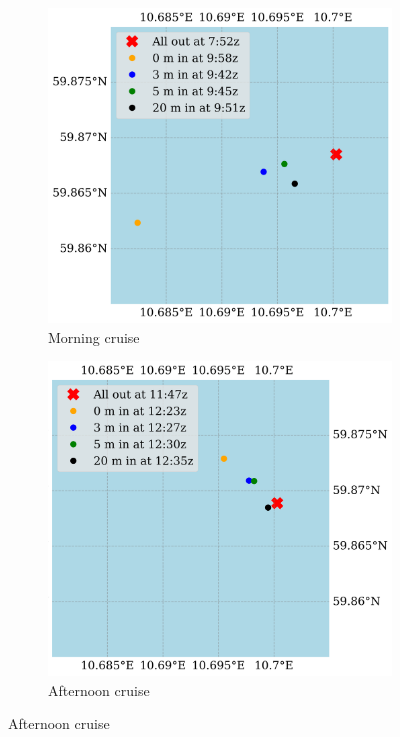 \documentclass[a4paper,10pt,english]{article}
\begin{document}
\begin{figure}[H]
    \begin{subfigure}{0.5\textwidth}
            \centering
            \includegraphics[width=1.\linewidth]{../figures/drifters/drifters_tokt1.png}
            \caption{Morning cruise}
            \label{fig:drifter_1}
    \end{subfigure}%
    \begin{subfigure}{0.5\textwidth}
            \centering
            \includegraphics[width=1.\linewidth]{../figures/drifters/drifters_tokt2.png}
            \caption{Afternoon cruise}
            \label{fig:drifter_2}
    \end{subfigure}
    

\end{figure}
\end{document}
